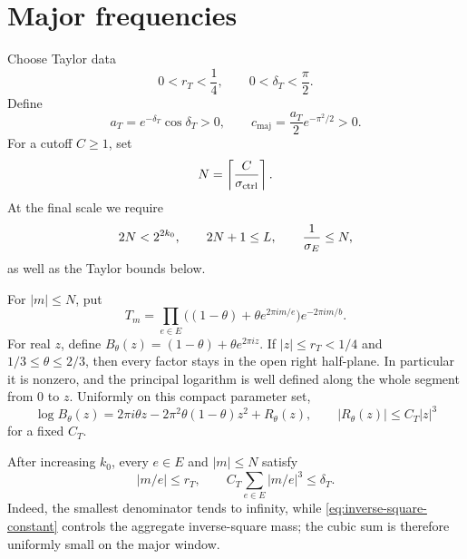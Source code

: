 \section{Major frequencies}\label{sec:main}

Choose Taylor data
\begin{equation}\label{eq:Taylor-data}
 0<r_T<\frac14,
 \qquad
 0<\delta_T<\frac\pi2.
\end{equation}
Define
\begin{equation}\label{eq:major-constants}
 a_T=e^{-\delta_T}\cos\delta_T>0,
 \qquad
 c_{\mathrm{maj}}=\frac{a_T}{2}e^{-\pi^2/2}>0.
\end{equation}
For a cutoff $C\ge1$, set
\begin{equation}\label{eq:N}
 N=\left\lceil\frac C{\sigma_{\mathrm{ctrl}}}\right\rceil.
\end{equation}
At the final scale we require
\begin{equation}\label{eq:main-geometry}
 2N<2^{2k_0},
 \qquad 2N+1\le L,
 \qquad \frac1{\sigma_E}\le N,
\end{equation}
as well as the Taylor bounds below.

For $|m|\le N$, put
\[
 T_m=
 \prod_{e\in E}\bigl((1-\theta)+\theta e^{2\pi im/e}\bigr)
 e^{-2\pi im/b}.
\]
For real $z$, define $B_\theta(z)=(1-\theta)+\theta e^{2\pi iz}$.  If
$|z|\le r_T<1/4$ and $1/3\le\theta\le2/3$, then every factor stays in the open
right half-plane.  In particular it is nonzero, and the principal logarithm is
well defined along the whole segment from $0$ to $z$.  Uniformly on this compact
parameter set,
\begin{equation}\label{eq:log-expansion}
 \log B_\theta(z)
 =2\pi i\theta z
  -2\pi^2\theta(1-\theta)z^2+R_\theta(z),
 \qquad |R_\theta(z)|\le C_T|z|^3
\end{equation}
for a fixed $C_T$.

After increasing $k_0$, every $e\in E$ and $|m|\le N$ satisfy
\begin{equation}\label{eq:Taylor-fields}
 |m/e|\le r_T,
 \qquad
 C_T\sum_{e\in E}|m/e|^3\le\delta_T.
\end{equation}
Indeed, the smallest denominator tends to infinity, while
\eqref{eq:inverse-square-constant} controls the aggregate inverse-square mass;
the cubic sum is therefore uniformly small on the major window.

